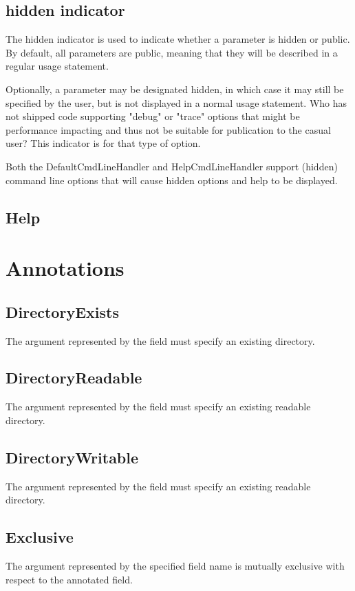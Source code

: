 \documentclass[a4paper,10pt]{article}
\begin{document}
\subsection{hidden indicator} 	The hidden indicator is used to indicate whether a parameter is hidden or public. By default, all parameters are public, meaning that they will be described in a regular usage statement.

Optionally, a parameter may be designated hidden, in which case it may still be specified by the user, but is not displayed in a normal usage statement. Who has not shipped code supporting "debug" or "trace" options that might be performance impacting and thus not be suitable for publication to the casual user? This indicator is for that type of option.

Both the DefaultCmdLineHandler and HelpCmdLineHandler support (hidden) command line options that will cause hidden options and help to be displayed.

\subsection{Help}

\section{Annotations}
\subsection{DirectoryExists}
The argument represented by the field must specify an existing directory.
\subsection{DirectoryReadable}
The argument represented by the field must specify an existing readable directory.
\subsection{DirectoryWritable}
The argument represented by the field must specify an existing readable directory.
\subsection{Exclusive}
The argument represented by the specified field name is mutually exclusive with respect to the annotated field.


\end{document}
